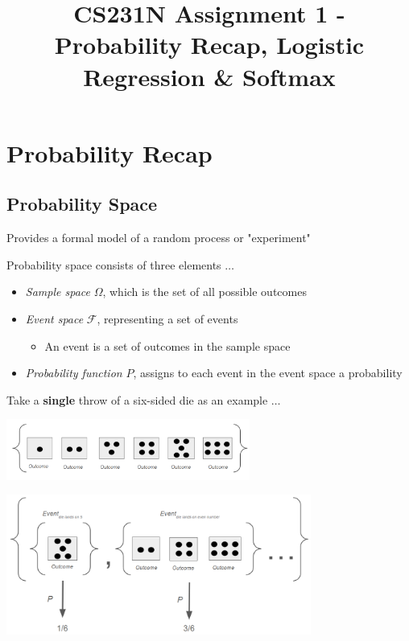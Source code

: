 \documentclass{article}
\title{\vspace{-2cm} CS231N Assignment 1 - Probability Recap, Logistic Regression \& Softmax}
\date{\vspace{-5ex}}
\begin{document}
\maketitle

\section{Probability Recap}
\subsection{Probability Space}
Provides a formal model of a random process or "experiment"

Probability space consists of three elements $\dots$
\begin{itemize}
    \item \textit{Sample space} $\Omega$, which is the set of all possible outcomes
    \item \textit{Event space} $\mathcal{F}$, representing a set of events
        \begin{itemize}
            \item An event is a set of outcomes in the sample space
        \end{itemize}
    \item \textit{Probability function} $P$, assigns to each event in the event space a probability
\end{itemize}\vspace{0.5cm}

Take a \textbf{single} throw of a six-sided die as an example $\dots$

\begin{minipage}[c]{0.5\textwidth}
    \includegraphics[width=8cm, scale=1]{images/sampleSpace.PNG}
    \captionsetup{justification=centering}
\end{minipage}%
\begin{minipage}[c]{0.5\textwidth}
    \includegraphics[width=10cm, scale=1]{images/eventSpace.PNG}
    \captionsetup{justification=centering}
\end{minipage}%
\end{document}
